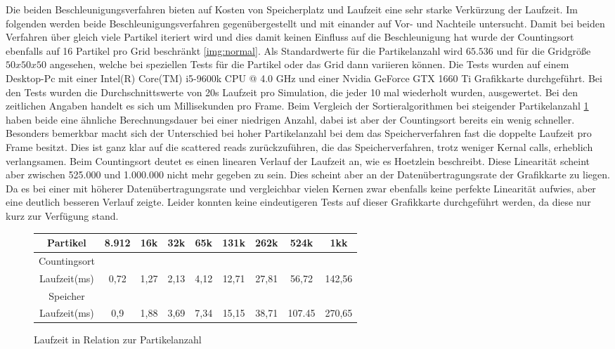 \documentclass[intern,palatino]{cgBA}
\begin{document}
Die beiden Beschleunigungsverfahren bieten auf Kosten von Speicherplatz und Laufzeit eine sehr starke Verkürzung der Laufzeit. Im folgenden werden beide Beschleunigungsverfahren gegenübergestellt und mit einander auf Vor- und Nachteile untersucht.
\newline
Damit bei beiden Verfahren über gleich viele Partikel iteriert wird und dies damit keinen Einfluss auf die Beschleunigung hat wurde der Countingsort ebenfalls auf 16 Partikel pro Grid beschränkt \ref{img:normal}. Als Standardwerte für die Partikelanzahl wird $65.536$ und für die Gridgröße $50x50x50$ angesehen, welche bei speziellen Tests für die Partikel oder das Grid dann variieren können.
\newline
Die Tests wurden auf einem Desktop-Pc mit einer Intel(R) Core(TM) i5-9600k CPU @ 4.0 GHz und einer Nvidia GeForce GTX 1660 Ti Grafikkarte durchgeführt. Bei den Tests wurden die Durchschnittswerte von 20s Laufzeit pro Simulation, die jeder 10 mal wiederholt wurden, ausgewertet. Bei den zeitlichen Angaben handelt es sich um Millisekunden pro Frame.
\newline
Beim Vergleich der Sortieralgorithmen bei steigender Partikelanzahl \ref{tab:particle} haben beide eine ähnliche Berechnungsdauer bei einer niedrigen Anzahl, dabei ist aber der Countingsort bereits ein wenig schneller. Besonders bemerkbar macht sich der Unterschied bei hoher Partikelanzahl bei dem das Speicherverfahren fast die doppelte Laufzeit pro Frame besitzt. Dies ist ganz klar auf die scattered reads zurückzuführen, die das Speicherverfahren, trotz weniger Kernal calls, erheblich verlangsamen. Beim Countingsort deutet es einen linearen Verlauf der Laufzeit an, wie es Hoetzlein \cite{nvidia} beschreibt. Diese Linearität scheint aber zwischen 525.000 und 1.000.000 nicht mehr gegeben zu sein. Dies scheint aber an der Datenübertragungsrate der Grafikkarte zu liegen. Da es bei einer mit höherer Datenübertragungsrate und vergleichbar vielen Kernen zwar ebenfalls keine perfekte Linearität aufwies, aber eine deutlich besseren Verlauf zeigte. Leider konnten keine eindeutigeren Tests auf dieser Grafikkarte durchgeführt werden, da diese nur kurz zur Verfügung stand.  
\newline

\begin{figure}[H]
	\centering
	\begin{tabular}{ | c || c | c | c | c | c | c | c | c |}
		\hline
		Partikel			&  8.912 & 16k & 32k & 65k & 131k & 262k & 524k & 1kk	\\ \hline
		Countingsort														\\ \hline
		Laufzeit(ms)		&   0,72 &  1,27 &  2,13 &  4,12 &  12,71 &  27,81 &  56,72 &  142,56		 	\\ \hline
		
		Speicher															\\ \hline
		Laufzeit(ms)		&   0,9 &  1,88 &  3,69 &  7,34 &  15,15 &  38,71 &  107.45 &  270,65	\\
		\hline
	\end{tabular}
	\caption{Laufzeit in Relation zur Partikelanzahl}
	\label{tab:particle}
\end{figure}
\end{document}
